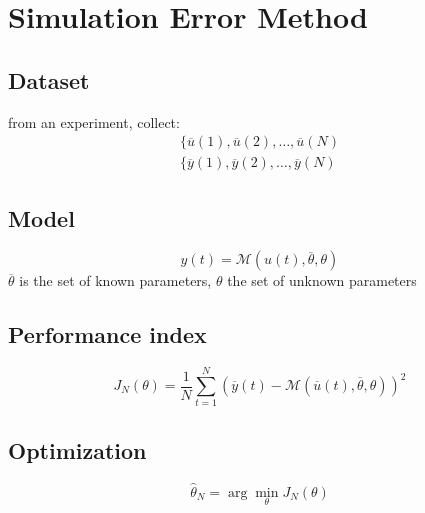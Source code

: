 \documentclass{report}
\begin{document}
\section{Simulation Error Method}
\begin{center}
\end{center}
\subsection{Dataset} from an experiment, collect:
\begin{align*}
\{\overline{u}(1),\overline{u}(2),\dots,\overline{u}(N)\\
\{\overline{y}(1),\overline{y}(2),\dots,\overline{y}(N)
\end{align*}
\subsection{Model}
\[
y(t)=\mathcal{M}(u(t),\overline{\theta},\theta)
\]
$\overline{\theta}$ is the set of known parameters, $\theta$ the set of unknown parameters
\subsection{Performance index}
\[
J_N(\theta)=\frac{1}{N}
\sum_{t=1}^N
\left(
\overline{y}(t)
-
\mathcal{M}(\overline{u}(t),\overline{\theta},\theta)
\right)^2
\]
\subsection{Optimization}
\[
\hat{\theta}_N=\arg\min_\theta J_N(\theta)
\]
\end{document}
